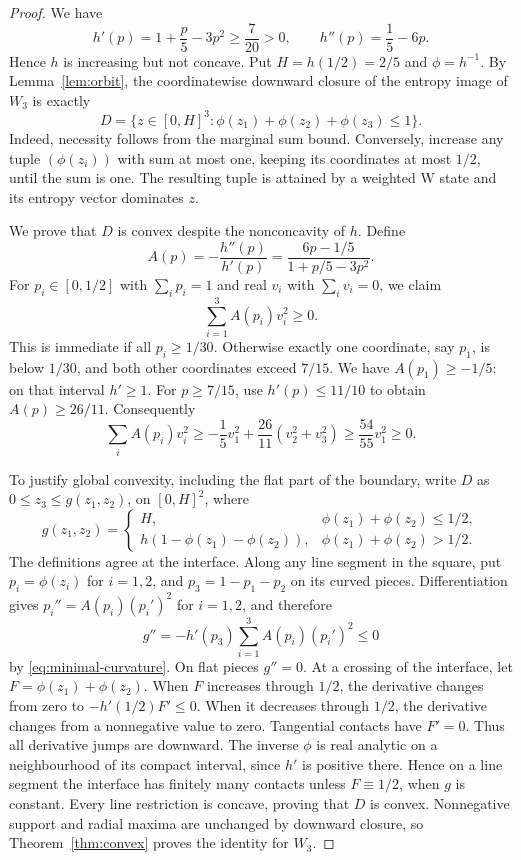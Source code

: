 \documentclass[11pt,a4paper]{article}
\begin{document}
\begin{proof}
We have
\[
 h'(p)=1+\frac p5-3p^2\ge\frac7{20}>0,\qquad
 h''(p)=\frac15-6p.
\]
Hence \(h\) is increasing but not concave. Put \(H=h(1/2)=2/5\)
and \(\phi=h^{-1}\). By Lemma~\ref{lem:orbit}, the coordinatewise
downward closure of the entropy image of \(W_3\) is exactly
\[
 D=\{z\in[0,H]^3:\phi(z_1)+\phi(z_2)+\phi(z_3)\le1\}.
\]
Indeed, necessity follows from the marginal sum bound. Conversely,
increase any tuple \((\phi(z_i))\) with sum at most one, keeping its
coordinates at most \(1/2\), until the sum is one. The resulting
tuple is attained by a weighted W state and its entropy vector
dominates \(z\).

We prove that \(D\) is convex despite the nonconcavity of \(h\).
Define
\[
 A(p)=-\frac{h''(p)}{h'(p)}
 =\frac{6p-1/5}{1+p/5-3p^2}.
\]
For \(p_i\in[0,1/2]\) with \(\sum_i p_i=1\) and real \(v_i\)
with \(\sum_i v_i=0\), we claim
\begin{equation}
 \sum_{i=1}^3 A(p_i)v_i^2\ge0.\label{eq:minimal-curvature}
\end{equation}
This is immediate if all \(p_i\ge1/30\). Otherwise exactly one
coordinate, say \(p_1\), is below \(1/30\), and both other
coordinates exceed \(7/15\). We have \(A(p_1)\ge-1/5\): on that
interval \(h'\ge1\). For \(p\ge7/15\), use \(h'(p)\le11/10\)
to obtain \(A(p)\ge26/11\). Consequently
\[
 \sum_i A(p_i)v_i^2
 \ge-\frac15v_1^2+\frac{26}{11}(v_2^2+v_3^2)
 \ge\frac{54}{55}v_1^2\ge0.
\]

To justify global convexity, including the flat part of the boundary,
write \(D\) as \(0\le z_3\le g(z_1,z_2)\), on \([0,H]^2\), where
\[
 g(z_1,z_2)=
 \begin{cases}
 H,&\phi(z_1)+\phi(z_2)\le1/2,\\
 h(1-\phi(z_1)-\phi(z_2)),&\phi(z_1)+\phi(z_2)>1/2.
 \end{cases}
\]
The definitions agree at the interface. Along any line segment in the
square, put \(p_i=\phi(z_i)\) for \(i=1,2\), and
\(p_3=1-p_1-p_2\) on its curved pieces. Differentiation gives
\(p_i''=A(p_i)(p_i')^2\) for \(i=1,2\), and therefore
\[
 g''=-h'(p_3)\sum_{i=1}^3 A(p_i)(p_i')^2\le0
\]
by \eqref{eq:minimal-curvature}. On flat pieces \(g''=0\).
At a crossing of the interface, let
\(F=\phi(z_1)+\phi(z_2)\). When \(F\) increases through \(1/2\),
the derivative changes from zero to \(-h'(1/2)F'\le0\).
When it decreases through \(1/2\), the derivative changes from a
nonnegative value to zero. Tangential contacts have \(F'=0\).
Thus all derivative jumps are downward. The inverse \(\phi\) is
real analytic on a neighbourhood of its compact interval, since
\(h'\) is positive there. Hence on a line segment the interface has
finitely many contacts unless \(F\equiv1/2\), when \(g\) is constant.
Every line restriction is concave, proving that \(D\) is convex.
Nonnegative support and radial maxima are unchanged by downward
closure, so Theorem~\ref{thm:convex} proves the identity for \(W_3\).


\end{proof}
\end{document}
